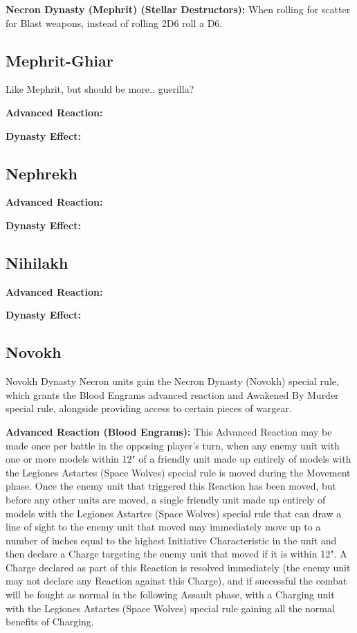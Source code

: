 \textbf{Necron Dynasty (Mephrit) (Stellar Destructors):} When rolling for scatter for Blast weapons, instead of rolling 2D6 roll a D6.


\subsection{Mephrit-Ghiar}

Like Mephrit, but should be more.. guerilla?

\textbf{Advanced Reaction:}

\textbf{Dynasty Effect:}


\subsection{Nephrekh}

\textbf{Advanced Reaction:}

\textbf{Dynasty Effect:}


\subsection{Nihilakh}

\textbf{Advanced Reaction:}

\textbf{Dynasty Effect:}


\subsection{Novokh}

Novokh Dynasty Necron units gain the Necron Dynasty (Novokh) special rule, which grants the Blood Engrams advanced reaction and Awakened By Murder special rule, alongside providing access to certain pieces of wargear.

\textbf{Advanced Reaction (Blood Engrams):} This Advanced Reaction may be made once per battle in the opposing player’s turn, when any enemy unit with one or more models within 12" of a friendly unit made up entirely of models with the Legiones Astartes (Space Wolves) special rule is moved during the Movement phase. Once the enemy unit that triggered this Reaction has been moved, but before any other units are moved, a single friendly unit made up entirely of models with the Legiones Astartes (Space Wolves) special rule that can draw a line of sight to the enemy unit that moved may immediately move up to a number of inches equal to the highest Initiative Characteristic in the unit and then declare a Charge targeting the enemy unit that moved if it is within 12". A Charge declared as part of this Reaction is resolved immediately (the enemy unit may not declare any Reaction against this Charge), and if successful the combat will be fought as normal in the following Assault phase, with a Charging unit with the Legiones Astartes (Space Wolves) special rule gaining all the normal benefits of Charging.

